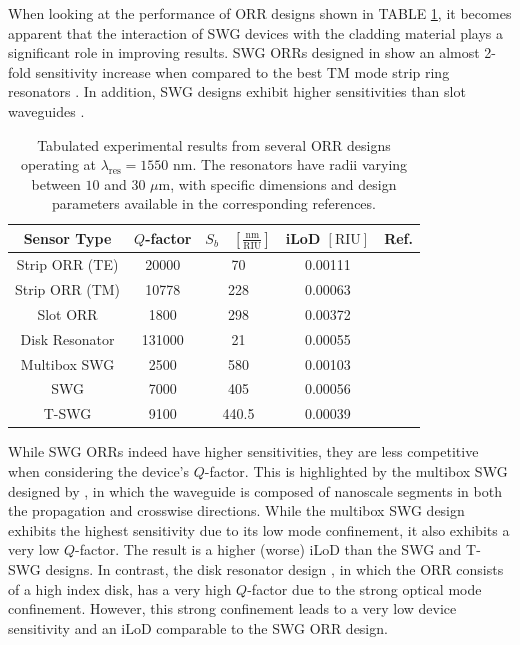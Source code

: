 \documentclass[aps,prl,twocolumn, superscriptaddress,nobalancelastpage]{revtex4}
\begin{document}

When looking at the performance of ORR designs shown in TABLE \ref{tab1}, it becomes apparent that the interaction of SWG devices with the cladding material plays a significant role in improving results. SWG ORRs designed in \cite{swg3} show an almost 2-fold sensitivity increase when compared to the best TM mode strip ring resonators \cite{StripBiosensor}. In addition, SWG designs \cite{swg3, TSWGbio, MultiboxSensor} exhibit higher sensitivities than slot waveguides \cite{SlotBiosensor}.
\pagebreak
\begin{table}[!h]
\centering
\begin{tabular}{|c|c|c|c|c|}
\hline
\textbf{Sensor Type} & \textbf{$Q$-factor} & \textbf{$S_b \quad \left[\frac{\text{nm}}{\text{RIU}}\right] $} & \textbf{iLoD $\left[\text{RIU}\right]$} & \textbf{Ref.} \\ \hline
Strip ORR (TE) & 20000 & 70 & 0.00111 & \cite{TEsensor} \\ \hline
Strip ORR (TM) & 10778 & 228 & 0.00063 & \cite{StripBiosensor} \\ \hline
Slot ORR & 1800 & 298 & 0.00372 & \cite{SlotBiosensor} \\ \hline
Disk Resonator & 131000 & 21 & 0.00055 & \cite{DiskSensor} \\ \hline
Multibox SWG & 2500 & 580 & 0.00103 & \cite{MultiboxSensor} \\ \hline
SWG & 7000 & 405 & 0.00056 & \cite{swg3} \\ \hline
T-SWG & 9100 & 440.5 & 0.00039 & \cite{TSWGbio} \\ \hline
\end{tabular}
\caption{Tabulated experimental results from several ORR designs operating at $\lambda_\text{res} = 1550$ nm. The resonators have radii varying between $10$ and $30$ $\mu$m, with specific dimensions and design parameters available in the corresponding references.}
\label{tab1}
\end{table}

While SWG ORRs indeed have higher sensitivities, they are less competitive when considering the device's $Q$-factor. This is highlighted by the multibox SWG designed by \cite{MultiboxSensor}, in which the waveguide is composed of nanoscale segments in both the propagation and crosswise directions. While the multibox SWG design exhibits the highest sensitivity due to its low mode confinement, it also exhibits a very low $Q$-factor. The result is a higher (worse) iLoD than the SWG and T-SWG designs. In contrast, the disk resonator design \cite{DiskSensor}, in which the ORR consists of a high index disk, has a very high $Q$-factor due to the strong optical mode confinement. However, this strong confinement leads to a very low device sensitivity and an iLoD comparable to the SWG ORR design. 
\end{document}

